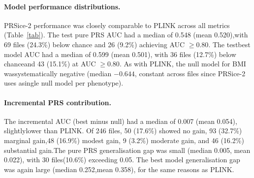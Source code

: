 \documentclass[11pt,a4paper]{article}
\begin{document}
\paragraph{Model performance distributions.}PRSice-2 performance was closely comparable to PLINK across all metrics (Table~\ref{tab}). The test pure PRS AUC had a median of 0.548 (mean 0.520),with 69 files (24.3\%) below chance and 26 (9.2\%) achieving AUC $\geq 0.80$. The testbest model AUC had a median of 0.599 (mean 0.501), with 36 files (12.7\%) below chanceand 43 (15.1\%) at AUC $\geq 0.80$. As with PLINK, the null model for BMI wassystematically negative (median $-0.644$, constant across files since PRSice-2 uses asingle null model per phenotype).

\begin{table}[h]
\centering
\caption{PRSice-2 test-set performance distribution across 246 successful files.}
\label{tab}
\end{table}

\paragraph{Incremental PRS contribution.}The incremental AUC (best minus null) had a median of 0.007 (mean 0.054), slightlylower than PLINK. Of 246 files, 50 (17.6\%) showed no gain, 93 (32.7\%) marginal gain,48 (16.9\%) modest gain, 9 (3.2\%) moderate gain, and 46 (16.2\%) substantial gain.The pure PRS generalisation gap was small (median 0.005, mean 0.022), with 30 files(10.6\%) exceeding 0.05. The best model generalisation gap was again large (median 0.252,mean 0.358), for the same reasons as PLINK.
\end{document}
